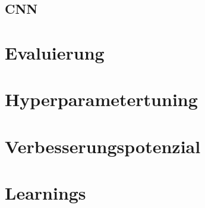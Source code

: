 \subsection{CNN}

\section{Evaluierung}


\section{Hyperparametertuning}

\section{Verbesserungspotenzial}

\section{Learnings}



